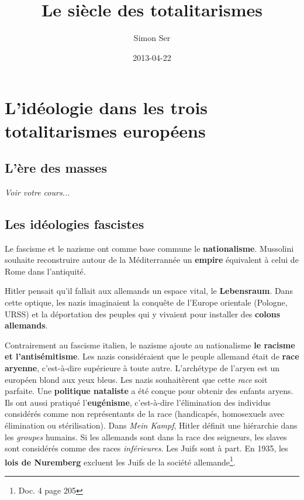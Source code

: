 \documentclass[12pt]{article}
\title{\textbf{Le siècle des totalitarismes}}
\author{Simon Ser}
\date{2013-04-22}
\begin{document}
\section{}
\section{}
\section{L'idéologie dans les trois totalitarismes européens}

\subsection{L'ère des masses}

\emph{Voir votre cours...}

\subsection{Les idéologies fascistes}

Le fascisme et le nazisme ont comme base commune le \textbf{nationalisme}. Mussolini souhaite reconstruire autour de la Méditerrannée un \textbf{empire} équivalent à celui de Rome dans l'antiquité.

Hitler pensait qu'il fallait aux allemands un espace vital, le \textbf{Lebensraum}. Dans cette optique, les nazis imaginaient la conquête de l'Europe orientale (Pologne, URSS) et la déportation des peuples qui y vivaient pour installer des \textbf{colons allemands}.

Contrairement au fascisme italien, le nazisme ajoute au nationalisme \textbf{le racisme et l'antisémitisme}. Les nazis considéraient que le peuple allemand était de \textbf{race aryenne}, c'est-à-dire supérieure à toute autre. L'archétype de l'aryen est un européen blond aux yeux bleus. Les nazis souhaitèrent que cette \emph{race} soit parfaite. Une \textbf{politique nataliste} a été conçue pour obtenir des enfants aryens. Ils ont aussi pratiqué l'\textbf{eugénisme}, c'est-à-dire l'élimination des individus considérés comme non représentants de la race (handicapés, homosexuels avec élimination ou stérilisation). Dans \emph{Mein Kampf}, Hitler définit une hiérarchie dans les \emph{groupes} humains. Si les allemands sont dans la race des seigneurs, les slaves sont considérés comme des races \emph{inférieures}. Les Juifs sont à part. En 1935, les \textbf{lois de Nuremberg} excluent les Juifs de la société allemande\footnote{Doc. 4 page 205}.
\end{document}

